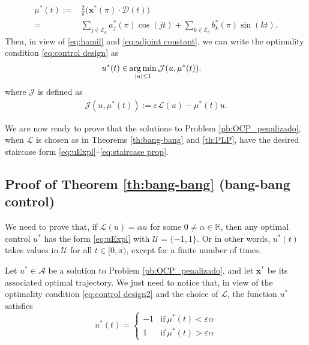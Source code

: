 \documentclass[twocolumn]{autart}    %
\begin{document}
\begin{align}\label{eq:m ast}
	\mu^\ast (t) := & \frac 2\pi \big(\bm{x}^*(\pi) \cdot \bm{\mathcal{D}}(t)\big) 
	\\[5pt]
	= & \sum_{j \in \mathcal{E}_a} a^*_j (\pi) \cos(jt) + \sum_{k \in \mathcal{E}_b} b^*_k (\pi) \sin(kt). \nonumber
\end{align}
Then, in view of \eqref{eq:hamil} and \eqref{eq:adjoint constant}, we can write the optimality condition \eqref{eq:control design} as
\begin{align}\label{eq:control design2}
    u^\ast(t)  \in & \operatorname*{arg\,min}_{|u|\leq 1}  \mathcal{J} (u,\mu^\ast(t)).  
\end{align}    
where $\mathcal{J}$ is defined as
\begin{align}\label{eq:functionalJ}
	\mathcal{J} (u,\mu^\ast(t)):= \varepsilon \mathcal{L}(u) - \mu^\ast(t) u .
\end{align}    

We are now ready to prove that the solutions to Problem \ref{pb:OCP_penalizado},  when $\mathcal{L}$ is chosen as in Theorems \ref{th:bang-bang} and \ref{th:PLP}, have the desired staircase form \eqref{eq:uExpl}--\eqref{eq:staircase prop}.

\subsection{Proof of Theorem \ref{th:bang-bang} (bang-bang control)}\label{sec: proof:bang-bang}

We need to prove that, if $\mathcal{L}(u) = \alpha u$ for some $0 \neq \alpha\in \mathbb{R}$, then any optimal control $u^\ast$ has the form \eqref{eq:uExpl} with $\mathcal{U}=\{-1,1\}$. Or in other words,  $u^\ast(t)$ takes values in $\mathcal{U}$ for all $t\in [0,\pi)$, except for a finite number of times.

Let $u^\ast\in \mathcal{A}$ be a solution to Problem \ref{pb:OCP_penalizado}, and let $\bm{x}^\ast$ be its associated optimal trajectory. We just need to notice that, in view of the optimality condition \eqref{eq:control design2} and the choice of $\mathcal{L}$, the function $u^\ast$  satisfies
$$
u^\ast (t) = 
\left\{ \begin{array}{ll}
-1 & \text{if} \   \mu^\ast(t) < \varepsilon\alpha \\
1 & \text{if} \  \mu^\ast(t) > \varepsilon\alpha
\end{array}\right.
$$
\end{document}
